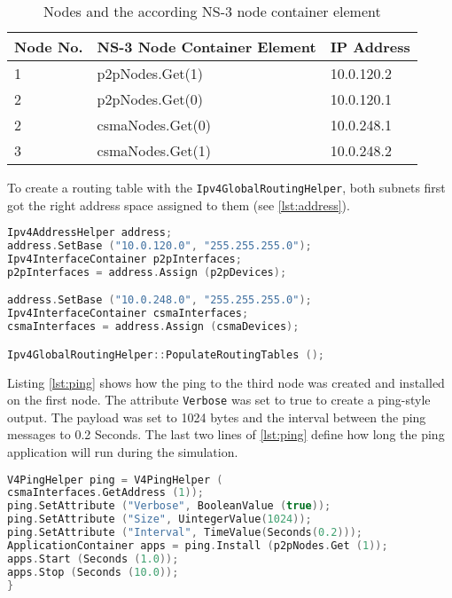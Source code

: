 \documentclass[parskip=full]{scrartcl}
\begin{document}
\begin{table}[hb]
	\centering
	\begin{tabular}{lll}
		\toprule
		\textbf{Node No.} & \textbf{NS-3 Node Container Element} & \textbf{IP Address}\\ \midrule
		1 & p2pNodes.Get(1) & 10.0.120.2 \\
		2 & p2pNodes.Get(0) & 10.0.120.1 \\
		2 & csmaNodes.Get(0) & 10.0.248.1 \\
		3 & csmaNodes.Get(1) & 10.0.248.2 \\
		\bottomrule
	\end{tabular}
	\caption{Nodes and the according NS-3 node container element}
	\label{tab:Nodes}
\end{table}
\clearpage

To create a routing table with the \verb|Ipv4GlobalRoutingHelper|, both subnets first got the right address space assigned to them (see \ref{lst:address}).

\begin{lstlisting}[language=c++, frame=single, captionpos=b, caption={IP address assignment and routing table creation}, label=lst:address]
Ipv4AddressHelper address;
address.SetBase ("10.0.120.0", "255.255.255.0");
Ipv4InterfaceContainer p2pInterfaces;
p2pInterfaces = address.Assign (p2pDevices);

address.SetBase ("10.0.248.0", "255.255.255.0");
Ipv4InterfaceContainer csmaInterfaces;
csmaInterfaces = address.Assign (csmaDevices);

Ipv4GlobalRoutingHelper::PopulateRoutingTables ();
\end{lstlisting}

Listing \ref{lst:ping} shows how the ping to the third node was created and installed on the first node. 
The attribute \verb|Verbose| was set to true to create a ping-style output. 
The payload was set to 1024 bytes and the interval between the ping messages to 0.2 Seconds.
The last two lines of \cref{lst:ping} define how long the ping application will run during the simulation.

\begin{lstlisting}[language=c++, frame=single , captionpos=b, label=lst:ping]
V4PingHelper ping = V4PingHelper (
csmaInterfaces.GetAddress (1));
ping.SetAttribute ("Verbose", BooleanValue (true));
ping.SetAttribute ("Size", UintegerValue(1024));
ping.SetAttribute ("Interval", TimeValue(Seconds(0.2)));
ApplicationContainer apps = ping.Install (p2pNodes.Get (1));
apps.Start (Seconds (1.0));
apps.Stop (Seconds (10.0));
}
\end{lstlisting}
\end{document}
